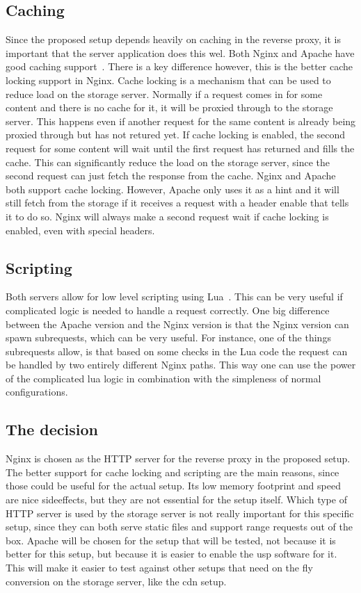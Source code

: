 \documentclass[twoside,openright]{uva-bachelor-thesis}
\begin{document}
\subsection{Caching}
Since the proposed setup depends heavily on caching in the reverse proxy, it is
important that the server application does this wel. Both Nginx and Apache have
good caching support~\autocites{nginxcache}{apachecache}. There is a key
difference however, this is the better cache locking support in Nginx. Cache
locking is a mechanism that can be used to reduce load on the storage server.
Normally if a request comes in for some content and there is no cache for it,
it will be proxied through to the storage server. This happens even if another
request for the same content is already being proxied through but has not
retured yet. If cache locking is enabled, the second request for some content
will wait until the first request has returned and fills the cache. This can
significantly reduce the load on the storage server, since the second request
can just fetch the response from the cache. Nginx and Apache both support cache
locking. However, Apache only uses it as a hint and it will still fetch from the
storage if it receives a request with a header enable that tells it to do so.
Nginx will always make a second request wait if cache locking is enabled, even
with special headers.


\subsection{Scripting}
Both servers allow for low level scripting using
Lua~\autocites{nginxlua}{cloudflarelua}{apachelua}. This can be very useful if
complicated logic is needed to handle a request correctly. One big difference
between the Apache version and the Nginx version is that the Nginx version
can spawn subrequests, which can be very useful. For instance, one of the things
subrequests allow, is that based on some checks in the Lua code the request can
be handled by two entirely different Nginx paths. This way one can use the power
of the complicated lua logic in combination with the simpleness of normal
configurations.


\subsection{The decision}
Nginx is chosen as the HTTP server for the reverse proxy in the proposed setup.
The better support for cache locking and scripting are the main reasons, since
those could be useful for the actual setup. Its low memory footprint and speed
are nice sideeffects, but they are not essential for the setup itself.  Which
type of HTTP server is used by the storage server is not really important for
this specific setup, since they can both serve static files and support
range requests out of the box. Apache will be chosen for the setup that will be
tested, not because it is better for this setup, but because it is easier to
enable the \gls{usp} software for it. This will make it easier to test against
other setups that need on the fly conversion on the storage server, like the
\gls{cdn} setup.
\end{document}
